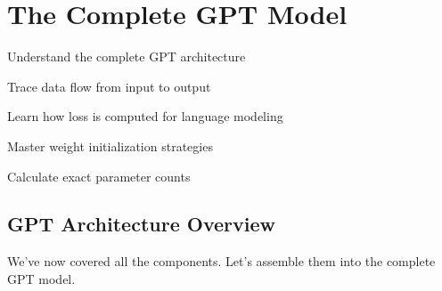 \chapter{The Complete GPT Model}
\label{ch:complete-gpt}

\begin{objectives}
    \item Understand the complete GPT architecture
    \item Trace data flow from input to output
    \item Learn how loss is computed for language modeling
    \item Master weight initialization strategies
    \item Calculate exact parameter counts
\end{objectives}

\section{GPT Architecture Overview}

We've now covered all the components. Let's assemble them into the complete GPT model.

